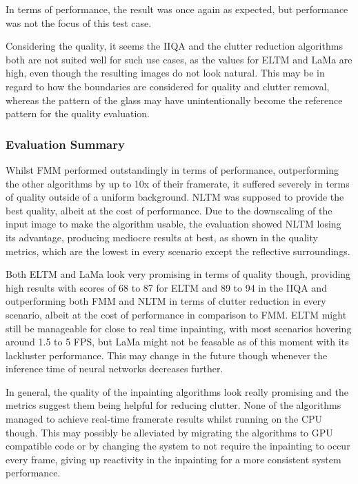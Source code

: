 In terms of performance, the result was once again as expected, but performance was not the focus of this test case.

Considering the quality, it seems the IIQA and the clutter reduction algorithms both are not suited well for such use cases, as the values for ELTM and LaMa are high, even though the resulting images do not look natural. 
This may be in regard to how the boundaries are considered for quality and clutter removal, whereas the pattern of the glass may have unintentionally become the reference pattern for the quality evaluation.

\subsubsection{Evaluation Summary}

Whilst FMM performed outstandingly in terms of performance, outperforming the other algorithms by up to 10x of their framerate, it suffered severely in terms of quality outside of a uniform background. NLTM was supposed to provide the best quality, albeit at the cost of performance. Due to the downscaling of the input image to make the algorithm usable, the evaluation showed NLTM losing its advantage, producing mediocre results at best, as shown in the quality metrics, which are the lowest in every scenario except the reflective surroundings.

Both ELTM and LaMa look very promising in terms of quality though, providing high results with scores of 68 to 87 for ELTM and 89 to 94 in the IIQA and outperforming both FMM and NLTM in terms of clutter reduction in every scenario, albeit at the cost of performance in comparison to FMM.
ELTM might still be manageable for close to real time inpainting, with most scenarios hovering around 1.5 to 5 FPS, but LaMa might not be feasable as of this moment with its lackluster performance. This may change in the future though whenever the inference time of neural networks decreases further.

In general, the quality of the inpainting algorithms look really promising and the metrics suggest them being helpful for reducing clutter. None of the algorithms managed to achieve real-time framerate results whilst running on the CPU though. This may possibly be alleviated by migrating the algorithms to GPU compatible code or by changing the system to not require the inpainting to occur every frame, giving up reactivity in the inpainting for a more consistent system performance.